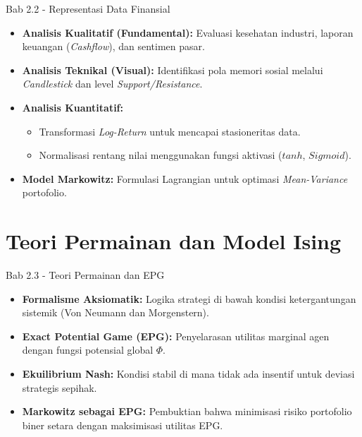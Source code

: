 \documentclass[aspectratio=169]{beamer}
\begin{document}
\begin{frame}{Bab 2.2 - Representasi Data Finansial}
    \begin{itemize}
        \item \textbf{Analisis Kualitatif (Fundamental):} Evaluasi kesehatan industri, laporan keuangan (\textit{Cashflow}), dan  sentimen pasar.
        \item \textbf{Analisis Teknikal (Visual):} Identifikasi pola memori sosial melalui \textit{Candlestick} dan  level \textit{Support/Resistance}.
        \item \textbf{Analisis Kuantitatif:}
        \begin{itemize}
            \item Transformasi \textit{Log-Return} untuk mencapai stasioneritas data.
            \item Normalisasi rentang nilai menggunakan fungsi aktivasi ($tanh$, $Sigmoid$).
        \end{itemize}
        \item \textbf{Model Markowitz:} Formulasi Lagrangian untuk optimasi \textit{Mean-Variance} portofolio.
    \end{itemize}
\end{frame}
\section{Teori Permainan  dan   Model Ising}

\begin{frame}{Bab 2.3 - Teori Permainan  dan   EPG}
    \begin{itemize}
        \item \textbf{Formalisme Aksiomatik:} Logika strategi di bawah kondisi ketergantungan sistemik (Von Neumann  dan   Morgenstern).
        \item \textbf{Exact Potential Game (EPG):} Penyelarasan utilitas marginal agen dengan fungsi potensial global $\Phi$.
        \item \textbf{Ekuilibrium Nash:} Kondisi stabil di mana tidak ada insentif untuk deviasi strategis sepihak.
        \item \textbf{Markowitz sebagai EPG:} Pembuktian bahwa minimisasi risiko portofolio biner setara dengan maksimisasi utilitas EPG.
    \end{itemize}
\end{frame}
\end{document}
